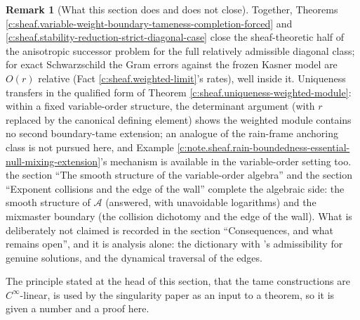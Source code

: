 \documentclass[11pt]{article}
\theoremstyle{definition}
\newtheorem{remark}[theorem]{Remark}
\theoremstyle{plain}
\begin{document}
\begin{remark}[What this section does and does not close]\label{c:note.sheaf.what-section-does-does-not-close}
Together, Theorems \ref{c:sheaf.variable-weight-boundary-tameness-completion-forced} and \ref{c:sheaf.stability-reduction-strict-diagonal-case} close the sheaf-theoretic half of the anisotropic successor problem for the full relatively admissible diagonal class; for exact Schwarzschild the Gram errors against the frozen Kasner model are $O(r)$ relative (Fact \ref{c:sheaf.weighted-limit}'s rates), well inside it. Uniqueness transfers in the qualified form of Theorem \ref{c:sheaf.uniqueness-weighted-module}: within a fixed variable-order structure, the determinant argument (with $r$ replaced by the canonical defining element) shows the weighted module contains no second boundary-tame extension; an analogue of the rain-frame anchoring class is not pursued here, and Example \ref{c:note.sheaf.rain-boundedness-essential-null-mixing-extension}'s mechanism is available in the variable-order setting too. the section ``The smooth structure of the variable-order algebra'' and the section ``Exponent collisions and the edge of the wall'' complete the algebraic side: the smooth structure of $\mathcal{A}$ (answered, with unavoidable logarithms) and the mixmaster boundary (the collision dichotomy and the edge of the wall). What is deliberately not claimed is recorded in the section ``Consequences, and what remains open'', and it is analysis alone: the dictionary with \cite{ButlerT6}'s admissibility for genuine solutions, and the dynamical traversal of the edges.
\end{remark}

\label{c:note.sheaf.setting-exponent-collisions-edge-wall-3}
The principle stated at the head of this section, that the tame constructions are $C^\infty$-linear, is used by the singularity paper \cite{ButlerT5} as an input to a theorem, so it is given a number and a proof here.
\end{document}
